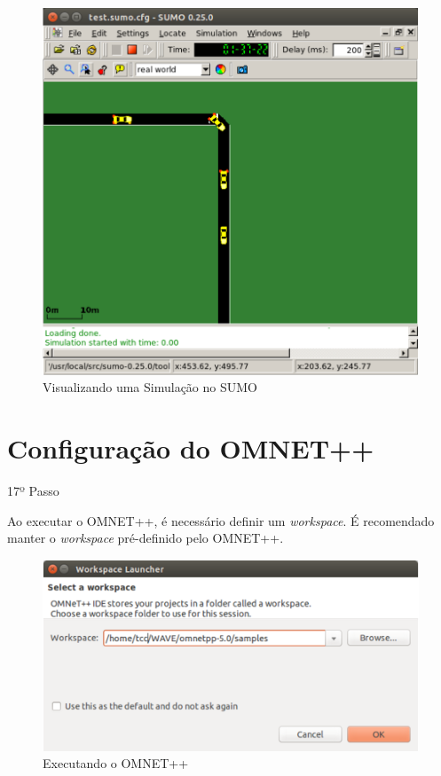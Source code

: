 \documentclass[
12pt,				%
openright,			%
oneside,			%
a4paper,			%
brazil,				%
]{abntex2}
\begin{document}
{\begin{anexosenv}
                \begin{figure} [H]
	                \centering
	                \includegraphics[scale=.4]{figuras/aneB/55EntendendoSimulacaoTeste}
	                \caption{\label{fig_55}Visualizando uma Simulação no SUMO}
                \end{figure}
				
        	\section{Configuração do OMNET++}
        	\label{anexo:ConfOmnet}

            	\begin{description}
	                \item[17º Passo]
	            \end{description}
	            \par Ao executar o OMNET++, é necessário definir um \textit{workspace}. É recomendado manter o \textit{workspace} pré-definido pelo OMNET++.
		            
                \begin{figure} [H]
	                \centering
	                \includegraphics[scale=.4]{figuras/aneB/56ExecutandoOmnet}
	                \caption{\label{fig_56}Executando o OMNET++}
                \end{figure}
                

\end{anexosenv}}
\end{document}
